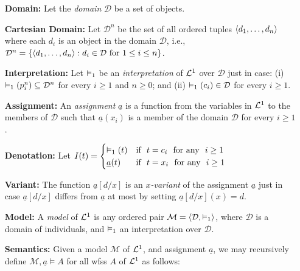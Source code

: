 \documentclass[a4paper, 11pt]{article} %
\begin{document}
\begin{enumerate}[leftmargin=1.2in] %
	\item[\bf Domain:] Let the \textit{domain} $\mathcal{D}$ be a set of objects.%
	\item[\bf Cartesian Domain:] Let $\mathcal{D}^n$ be the set of all ordered tuples $\langle d_1,\dots,d_n\rangle$ where each $d_i$ is an object in the domain $\mathcal{D}$, i.e., $\mathcal{D}^n=\lbrace\langle d_1,\dots,d_n\rangle:d_i\in\mathcal{D}~\text{for}~1\leq i\leq n\rbrace$.
	\item[\bf Interpretation:] Let $\vDash_1$ be an \textit{interpretation} of $\mathcal{L}^1$ over $\mathcal{D}$ just in case: (i) $\vDash_1(p_i^n)\subseteq\mathcal{D}^n$ for every $i\geq1$ and $n\geq0$; and (ii) $\vDash_1(c_i)\in\mathcal{D}$ for every $i\geq1$.
	\item[\bf Assignment:] An \textit{assignment} $\underline{a}$ is a function from the variables in $\mathcal{L}^1$ to the members of $\mathcal{D}$ such that $\underline{a}(x_i)$ is a member of the domain $\mathcal{D}$ for every $i\geq1$.
	\item[\bf Denotation:] Let $I(t)=
		      \begin{cases}
			      \vDash_1(t)     & \text{if}~~ t=c_i ~~\text{for any}~~ i\geq1 \\
			      \underline{a}(t) & \text{if}~~ t=x_i ~~\text{for any}~~ i\geq1
		      \end{cases}$
	\item[\bf Variant:] The function $\underline{a}[d/x]$ is an \textit{$x$-variant} of the assignment $\underline{a}$ just in case $\underline{a}[d/x]$ differs from $\underline{a}$ at most by setting $\underline{a}[d/x](x)=d$.
	\item[\bf Model:] A \textit{model} of $\mathcal{L}^1$ is any ordered pair $\mathcal{M}=\langle\mathcal{D},\vDash_1\rangle$, where $\mathcal{D}$ is a domain of individuals, and $\vDash_1$ an interpretation over $\mathcal{D}$.
	\item[\bf Semantics:] Given a model $\mathcal{M}$ of $\mathcal{L}^1$, and assignment $\underline{a}$, we may recursively define $\mathcal{M},\underline{a}\vDash A$ for all wfss $A$ of $\mathcal{L}^1$ as follows:
	      \begin{small}

\end{small}
\end{enumerate}
\end{document}

